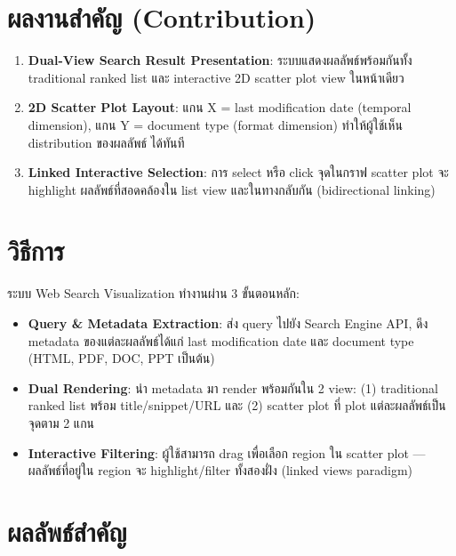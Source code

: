 \documentclass[10pt,a4paper]{article}
\begin{document}
\section*{ผลงานสำคัญ (Contribution)}

\begin{enumerate}[nosep, leftmargin=2em]
  \item \textbf{Dual-View Search Result Presentation}: ระบบแสดงผลลัพธ์พร้อมกันทั้ง
    traditional ranked list และ interactive 2D scatter plot view ในหน้าเดียว
  \item \textbf{2D Scatter Plot Layout}: แกน X = last modification date (temporal dimension),
    แกน Y = document type (format dimension) ทำให้ผู้ใช้เห็น distribution ของผลลัพธ์
    ได้ทันที
  \item \textbf{Linked Interactive Selection}: การ select หรือ click จุดในกราฟ scatter plot
    จะ highlight ผลลัพธ์ที่สอดคล้องใน list view และในทางกลับกัน (bidirectional linking)
\end{enumerate}

\section*{วิธีการ}

ระบบ Web Search Visualization ทำงานผ่าน 3 ขั้นตอนหลัก:
\begin{itemize}
  \item \textbf{Query \& Metadata Extraction}: ส่ง query ไปยัง Search Engine API,
    ดึง metadata ของแต่ละผลลัพธ์ได้แก่ last modification date และ document type
    (HTML, PDF, DOC, PPT เป็นต้น)
  \item \textbf{Dual Rendering}: นำ metadata มา render พร้อมกันใน 2 view: (1)
    traditional ranked list พร้อม title/snippet/URL และ (2) scatter plot ที่ plot
    แต่ละผลลัพธ์เป็นจุดตาม 2 แกน
  \item \textbf{Interactive Filtering}: ผู้ใช้สามารถ drag เพื่อเลือก region ใน scatter
    plot --- ผลลัพธ์ที่อยู่ใน region จะ highlight/filter ทั้งสองฝั่ง (linked views
    paradigm)
\end{itemize}

\section*{ผลลัพธ์สำคัญ}
\end{document}
